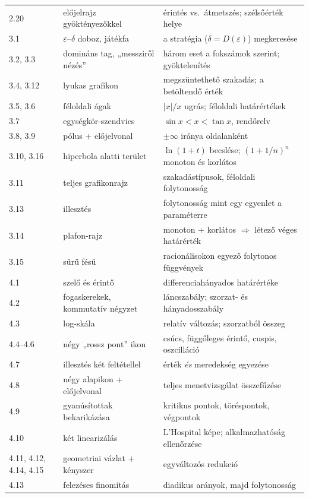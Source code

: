 \documentclass[11pt,a4paper]{article}
\newcommand{\eps}{\varepsilon}
\theoremstyle{definition}
\begin{document}
\begin{longtable}{@{}p{2.2cm}p{5.0cm}p{7.6cm}@{}}
2.20 & előjelrajz gyöktényezőkkel & érintés vs.\ átmetszés; szélsőérték helye \\
3.1 & $\eps$--$\delta$ doboz, játékfa & a stratégia ($\delta = D(\eps)$) megkeresése \\
3.2, 3.3 & domináns tag, „messziről nézés” & három eset a fokszámok szerint; gyöktelenítés \\
3.4, 3.12 & lyukas grafikon & megszüntethető szakadás; a betöltendő érték \\
3.5, 3.6 & féloldali ágak & $|x|/x$ ugrás; féloldali határértékek \\
3.7 & egységkör-szendvics & $\sin x < x < \tan x$, rendőrelv \\
3.8, 3.9 & pólus + előjelvonal & $\pm\infty$ iránya oldalanként \\
3.10, 3.16 & hiperbola alatti terület & $\ln(1+t)$ becslése; $(1+1/n)^n$ monoton és korlátos \\
3.11 & teljes grafikonrajz & szakadástípusok, féloldali folytonosság \\
3.13 & illesztés & folytonosság mint egy egyenlet a paraméterre \\
3.14 & plafon-rajz & monoton + korlátos $\Rightarrow$ létező véges határérték \\
3.15 & sűrű fésű & racionálisokon egyező folytonos függvények \\
4.1 & szelő és érintő & differenciahányados határértéke \\
4.2 & fogaskerekek, kommutatív négyzet & láncszabály; szorzat- és hányadosszabály \\
4.3 & log-skála & relatív változás; szorzatból összeg \\
4.4--4.6 & négy „rossz pont” ikon & csúcs, függőleges érintő, cuspis, oszcilláció \\
4.7 & illesztés két feltétellel & érték \emph{és} meredekség egyezése \\
4.8 & négy alapikon + előjelvonal & teljes menetvizsgálat összefűzése \\
4.9 & gyanúsítottak bekarikázása & kritikus pontok, töréspontok, végpontok \\
4.10 & két linearizálás & L'Hospital képe; alkalmazhatóság ellenőrzése \\
4.11, 4.12, 4.14, 4.15 & geometriai vázlat + kényszer & egyváltozós redukció \\
4.13 & felezéses finomítás & diadikus arányok, majd folytonosság \\
\end{longtable}
\endgroup
\end{document}
